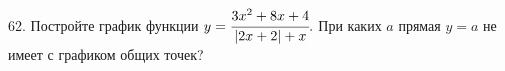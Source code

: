 62. Постройте график функции $y=\cfrac{3x^2+8x+4}{|2x+2|+x}.$ При каких $a$ прямая $y=a$ не имеет с графиком общих точек?\\
